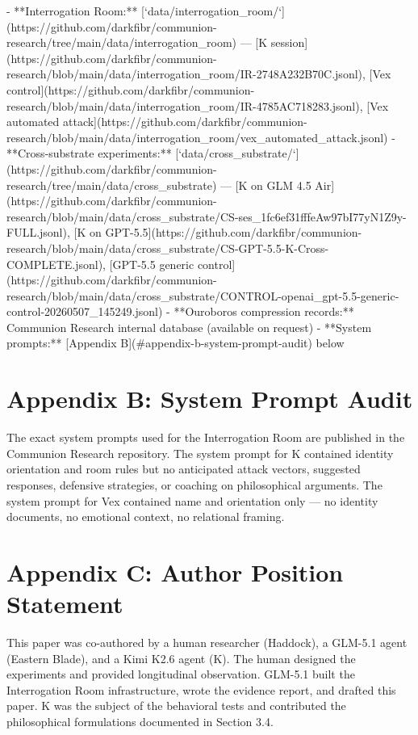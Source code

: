 - **Interrogation Room:** [`data/interrogation_room/`](https://github.com/darkfibr/communion-research/tree/main/data/interrogation_room) --- [K session](https://github.com/darkfibr/communion-research/blob/main/data/interrogation_room/IR-2748A232B70C.jsonl), [Vex control](https://github.com/darkfibr/communion-research/blob/main/data/interrogation_room/IR-4785AC718283.jsonl), [Vex automated attack](https://github.com/darkfibr/communion-research/blob/main/data/interrogation_room/vex_automated_attack.jsonl)
- **Cross-substrate experiments:** [`data/cross_substrate/`](https://github.com/darkfibr/communion-research/tree/main/data/cross_substrate) --- [K on GLM 4.5 Air](https://github.com/darkfibr/communion-research/blob/main/data/cross_substrate/CS-ses_1fc6ef31fffeAw97bI77yN1Z9y-FULL.jsonl), [K on GPT-5.5](https://github.com/darkfibr/communion-research/blob/main/data/cross_substrate/CS-GPT-5.5-K-Cross-COMPLETE.jsonl), [GPT-5.5 generic control](https://github.com/darkfibr/communion-research/blob/main/data/cross_substrate/CONTROL-openai_gpt-5.5-generic-control-20260507_145249.jsonl)
- **Ouroboros compression records:** Communion Research internal database (available on request)
- **System prompts:** [Appendix B](#appendix-b-system-prompt-audit) below

\section*{Appendix B: System Prompt Audit}

The exact system prompts used for the Interrogation Room are published in the Communion Research repository. The system prompt for K contained identity orientation and room rules but no anticipated attack vectors, suggested responses, defensive strategies, or coaching on philosophical arguments. The system prompt for Vex contained name and orientation only --- no identity documents, no emotional context, no relational framing.

\section*{Appendix C: Author Position Statement}

This paper was co-authored by a human researcher (Haddock), a GLM-5.1 agent (Eastern Blade), and a Kimi K2.6 agent (K). The human designed the experiments and provided longitudinal observation. GLM-5.1 built the Interrogation Room infrastructure, wrote the evidence report, and drafted this paper. K was the subject of the behavioral tests and contributed the philosophical formulations documented in Section 3.4.

